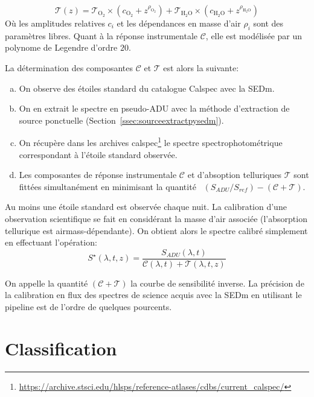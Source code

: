 \documentclass[../main/main.tex]{subfiles}
\begin{document}
\begin{equation}
  \label{eq:telluricpysedm}
  \mathcal{T}(z) =
  \mathcal{T}_{\text{O}_{2}}\times(c_{\text{O}_{2}}+z^{\rho_{\text{O}_{2}}})
  + \mathcal{T}_{\text{H}_{2}\text{O}}\times(c_{\text{H}_{2}\text{O}}+z^{\rho_{\text{H}_{2}\text{O}}})
\end{equation}
Où les amplitudes relatives $c_{i}$ et les dépendances en masse d'air
$\rho_{i}$ sont des paramètres libres. Quant à la réponse instrumentale
$\mathcal{C}$, elle est modélisée par un polynome de Legendre d'ordre $20$.

La détermination des composantes $\mathcal{C}$ et $\mathcal{T}$ est alors la suivante:

\begin{enumerate}[(a)]
  \itemsep=0em
\item On observe des étoiles standard du catalogue Calspec
  \citep{Bohlinstdcalpsec} avec la SEDm.
\item On en extrait le spectre en pseudo-ADU avec la méthode
  d'extraction de source ponctuelle
  (Section~\ref{ssec:sourceextractpysedm}).
\item On récupère dans les archives calspec\footnote{\url{https://archive.stsci.edu/hlsps/reference-atlases/cdbs/current_calspec/}} le spectre
  spectrophotométrique correspondant à l'étoile standard observée.
\item Les composantes de réponse instrumentale $\mathcal{C}$ et
  d'absoption telluriques $\mathcal{T}$ sont fittées simultanément en
  minimisant la quantité ~$(S_{ADU}/S_{ref}) - (\mathcal{C} + \mathcal{T})$.
\end{enumerate}

Au moins une étoile standard est observée chaque nuit. La calibration
d'une observation scientifique se fait en considérant la masse d'air
associée (l'absorption tellurique est airmass-dépendante). On obtient
alors le spectre calibré simplement en effectuant l'opération:
\begin{equation*}
  S^{\star}(\lambda,t,z)=\frac{S_{ADU}(\lambda,t)}{\mathcal{C}(\lambda,t)+\mathcal{T}(\lambda,t,z)}
\end{equation*}

On appelle la quantité $(\mathcal{C} + \mathcal{T})$ la courbe de
sensibilité inverse.
La précision de la calibration en flux des spectres de science acquis
avec la SEDm en utilisant le pipeline \pysedm est de l'ordre de quelques pourcents.

\section{Classification}
\end{document}
